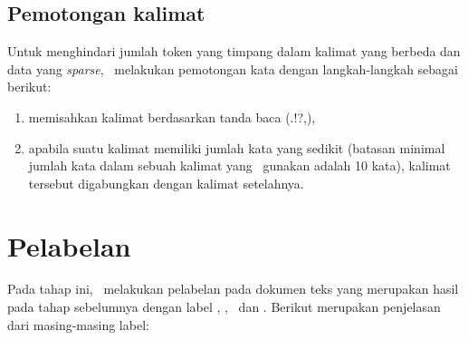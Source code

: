 \subsection{Pemotongan kalimat}
Untuk menghindari jumlah token yang timpang dalam kalimat yang berbeda dan data yang \textit{sparse}, \saya~melakukan pemotongan kata dengan langkah-langkah sebagai berikut:
\begin{enumerate}
	\item memisahkan kalimat berdasarkan tanda baca (.!?,),
	\item apabila suatu kalimat memiliki jumlah kata yang sedikit (batasan minimal jumlah kata dalam sebuah kalimat yang \saya~gunakan adalah 10 kata), kalimat tersebut digabungkan dengan kalimat setelahnya.
\end{enumerate}

\section{Pelabelan}
Pada tahap ini, \saya~melakukan pelabelan pada dokumen teks yang merupakan hasil pada tahap sebelumnya dengan label \disease, \symptom, \drug~dan \treatment. Berikut merupakan penjelasan dari masing-masing label:
